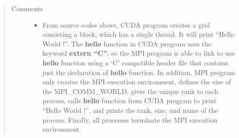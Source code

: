 \documentclass[letterpaper,10pt,openany,oneside]{sphinxmanual}
\begin{document}
\begin{quote}\begin{description}
\item[{Comments}] \leavevmode\begin{itemize}
\item {} 
From source codes above, CUDA program creates a grid consisting a block, which has a single thread. It will print “Hello World !”. The \textbf{hello} function in CUDA program uses the keyword \textbf{extern “C”}, so the MPI program is able to link to use \textbf{hello} function using a `C' compatible header file that contains just the declaration of \textbf{hello} function. In addition, MPI program only creates the MPI execution environment, defines the size of the MPI\_COMM\_WORLD, gives the unique rank to each process, calls \textbf{hello} function from CUDA program to print ``Hello World !'', and prints the rank, size, and name of the process. Finally, all processes terminate the MPI execution environment.

\end{itemize}

\end{description}\end{quote}
\end{document}
